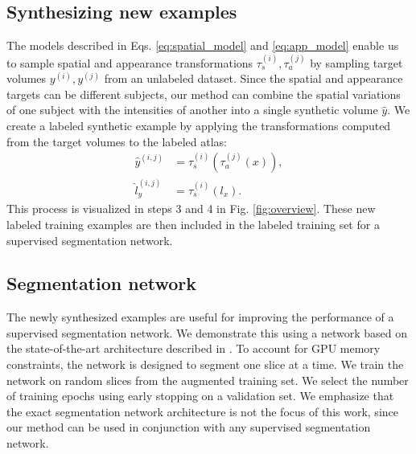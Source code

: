 \documentclass[10pt,twocolumn,letterpaper]{article}
\begin{document}
\subsection{Synthesizing new examples}\label{sec:methods_sampling}
The models described in Eqs. \eqref{eq:spatial_model} and \eqref{eq:app_model} enable us to sample spatial and appearance transformations $\tau^{(i)}_s, \tau^{(j)}_a$ by sampling target volumes $y^{(i)}, y^{(j)}$ from an unlabeled dataset. Since the spatial and appearance targets can be different subjects, our method can combine the spatial variations of one subject with the intensities of another into a single synthetic volume $\hat{y}$. We create a labeled synthetic example by applying the transformations computed from the target volumes to the labeled atlas: 
\vspace{-1pt}
\begin{align*}
\hat y^{(i,j)}&=\tau^{(i)}_s(\tau^{(j)}_a(x)),\nonumber\\
\hat l^{(i,j)}_y &=\tau^{(i)}_s(l_x).
\end{align*}
This process is visualized in steps 3 and 4 in Fig. \ref{fig:overview}. 
These new labeled training examples are then included in the labeled training set for a supervised segmentation network.


\subsection{Segmentation network}
The newly synthesized examples are useful for improving the performance of a supervised segmentation network. We demonstrate this using a network based on the state-of-the-art architecture described in \cite{roy2017error}. To account for GPU memory constraints, the network is designed to segment one slice at a time. We train the network on random slices from the augmented training set. We select the number of training epochs using early stopping on a validation set. We emphasize that the exact segmentation network architecture is not the focus of this work, since our method can be used in conjunction with any supervised segmentation network.
\end{document}
